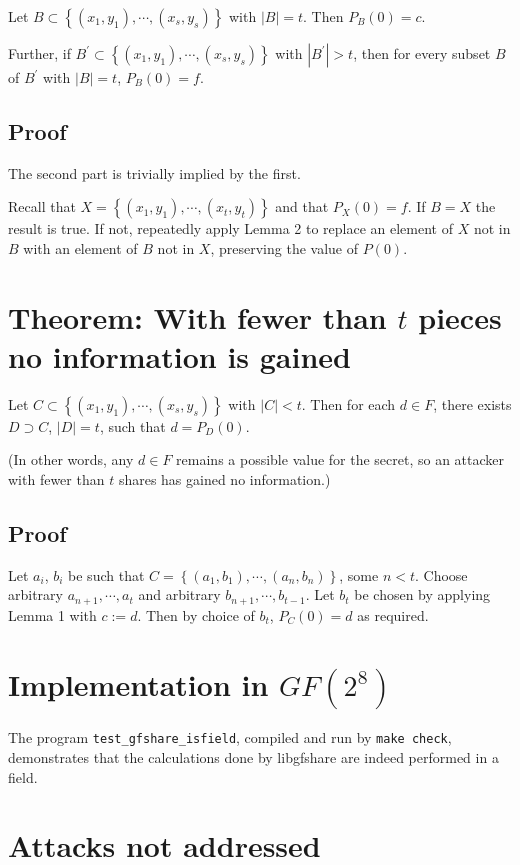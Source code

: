 \documentclass[]{article}
\begin{document}
Let $B \subset\left\{(x_1,y_1),\cdots,(x_s,y_s)\right\}$ with $|B| = t$.
Then $P_B(0) = c$.

Further, if $B^\prime \subset\left\{(x_1,y_1),\cdots,(x_s,y_s)\right\}$
with $|B^\prime| > t$, then for every subset $B$ of $B^\prime$ with
$|B| = t$, $P_B(0) = f$.

\subsection{Proof}

The second part is trivially implied by the first.

Recall that $X = \left\{(x_1,y_1),\cdots,(x_t,y_t)\right\}$ and that
$P_X(0) = f$. If $B = X$ the result is true. If not, repeatedly apply
Lemma 2 to replace an element of $X$ not in $B$ with an element of $B$ not
in $X$, preserving the value of $P(0)$.

\section{Theorem: With fewer than $t$ pieces no information is gained}

Let $C \subset\left\{(x_1,y_1),\cdots,(x_s,y_s)\right\}$ with $|C|< t$.
Then for each $d\in F$, there exists $D\supset C$, $|D| = t$, such that
$d = P_D(0)$.

(In other words, any $d\in F$ remains a possible value for the secret, so
an attacker with fewer than $t$ shares has gained no information.)

\subsection{Proof}

Let $a_i$, $b_i$ be such that $C = \left\{(a_1,b_1),\cdots,(a_n,b_n)\right\}$,
some $n < t$. Choose arbitrary $a_{n+1},\cdots,a_{t}$ and arbitrary
$b_{n+1},\cdots,b_{t-1}$. Let $b_t$ be chosen by applying Lemma 1
with $c := d$. Then by choice of $b_t$, $P_C(0) = d$ as required.

\section{Implementation in $GF(2^8)$}

The program \texttt{test\_gfshare\_isfield}, compiled and run by
\texttt{make check}, demonstrates that the calculations done by
libgfshare are indeed performed in a field.

\section{Attacks not addressed}
\end{document}
